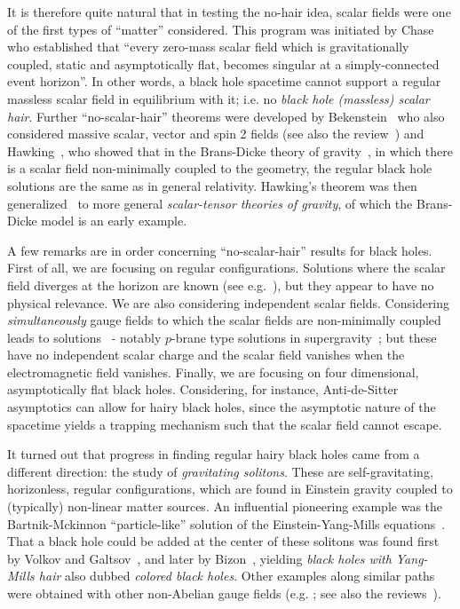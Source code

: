 It is therefore quite natural that in testing the no-hair idea, scalar fields were one of the first types of ``matter'' considered.
This program was initiated by Chase~\cite{Chase:1970wq} who established that ``every zero-mass scalar field which is gravitationally coupled, static and asymptotically flat, becomes singular at a simply-connected event horizon''.
In other words, a black hole spacetime cannot support a regular massless scalar field in equilibrium with it; i.e. no \textit{black hole (massless) scalar hair}.
Further ``no-scalar-hair'' theorems were developed by Bekenstein~\cite{Bekenstein:1971hc,Bekenstein:1972ky} who also considered massive scalar, vector and spin 2 fields (see also the review~\cite{Bekenstein:1996pn}) and Hawking~\cite{Hawking:1972qk}, who showed that in the Brans-Dicke theory of gravity~\cite{Brans:1961sx}, in which there is a scalar field non-minimally coupled to the geometry, the regular black hole solutions are the same as in general relativity.
Hawking's theorem was then generalized~\cite{Sotiriou:2011dz} to more general \textit{scalar-tensor theories of gravity}, of which the Brans-Dicke model is an early example.

A few remarks are in order concerning ``no-scalar-hair'' results for black holes.
First of all, we are focusing on regular configurations.
Solutions where the scalar field diverges at the horizon are known (see e.g.~\cite{BBM}), but they appear to have no physical relevance.
We are also considering independent scalar fields.
Considering \textit{simultaneously} gauge fields to which the scalar fields are non-minimally coupled leads to solutions~\cite{Gibbons:1982ih,Gibbons:1987ps} - notably $p$-brane type solutions in supergravity~\cite{Horowitz:1991cd}; but these have no independent scalar charge and the scalar field vanishes when the electromagnetic field vanishes.
Finally, we are focusing on four dimensional, asymptotically flat black holes.
Considering, for instance, Anti-de-Sitter asymptotics can allow for hairy black holes, since the asymptotic nature of the spacetime yields a trapping mechanism such that the scalar field cannot escape. 

It turned out that progress in finding regular hairy black holes came from a different direction: the study of \textit{gravitating solitons}.
These are self-gravitating, horizonless, regular configurations, which are found in Einstein gravity coupled to (typically) non-linear matter sources.
An influential pioneering example was the Bartnik-Mckinnon ``particle-like'' solution of the Einstein-Yang-Mills equations~\cite{Bartnik:1988am}.
That a black hole could be added at the center of these solitons was found first by Volkov and Galtsov~\cite{Volkov:1989fi}, and later by Bizon~\cite{Bizon:1990sr}, yielding \textit{black holes with Yang-Mills hair} also dubbed \textit{colored black holes}.
Other examples along similar paths were obtained with other non-Abelian gauge fields (e.g. \cite{Droz:1991cx,Lavrelashvili:1992cp}; see also the reviews~\cite{Bizon:1994dh,Volkov:1998cc}).

